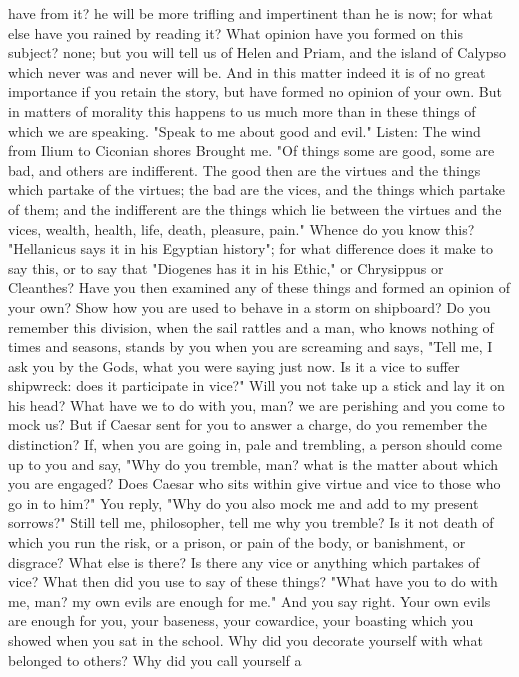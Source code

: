 \documentclass[a4paper]{article}
\begin{document}
have from it? he will be more trifling and impertinent than he is now; for what
else have you rained by reading it? What opinion have you formed on this
subject? none; but you will tell us of Helen and Priam, and the island of
Calypso which never was and never will be. And in this matter indeed it is of
no great importance if you retain the story, but have formed no opinion of your
own. But in matters of morality this happens to us much more than in these
things of which we are speaking.
    "Speak to me about good and evil." Listen:
       The wind from Ilium to Ciconian shores
       Brought me.
    "Of things some are good, some are bad, and others are indifferent. The
good then are the virtues and the things which partake of the virtues; the bad
are the vices, and the things which partake of them; and the indifferent are
the things which lie between the virtues and the vices, wealth, health, life,
death, pleasure, pain." Whence do you know this? "Hellanicus says it in his
Egyptian history"; for what difference does it make to say this, or to say that
"Diogenes has it in his Ethic," or Chrysippus or Cleanthes? Have you then
examined any of these things and formed an opinion of your own? Show how you
are used to behave in a storm on shipboard? Do you remember this division, when
the sail rattles and a man, who knows nothing of times and seasons, stands by
you when you are screaming and says, "Tell me, I ask you by the Gods, what you
were saying just now. Is it a vice to suffer shipwreck: does it participate in
vice?" Will you not take up a stick and lay it on his head? What have we to do
with you, man? we are perishing and you come to mock us? But if Caesar sent for
you to answer a charge, do you remember the distinction? If, when you are going
in, pale and trembling, a person should come up to you and say, "Why do you
tremble, man? what is the matter about which you are engaged? Does Caesar who
sits within give virtue and vice to those who go in to him?" You reply, "Why do
you also mock me and add to my present sorrows?" Still tell me, philosopher,
tell me why you tremble? Is it not death of which you run the risk, or a
prison, or pain of the body, or banishment, or disgrace? What else is there? Is
there any vice or anything which partakes of vice? What then did you use to say
of these things? "What have you to do with me, man? my own evils are enough for
me." And you say right. Your own evils are enough for you, your baseness, your
cowardice, your boasting which you showed when you sat in the school. Why did
you decorate yourself with what belonged to others? Why did you call yourself a
\end{document}
